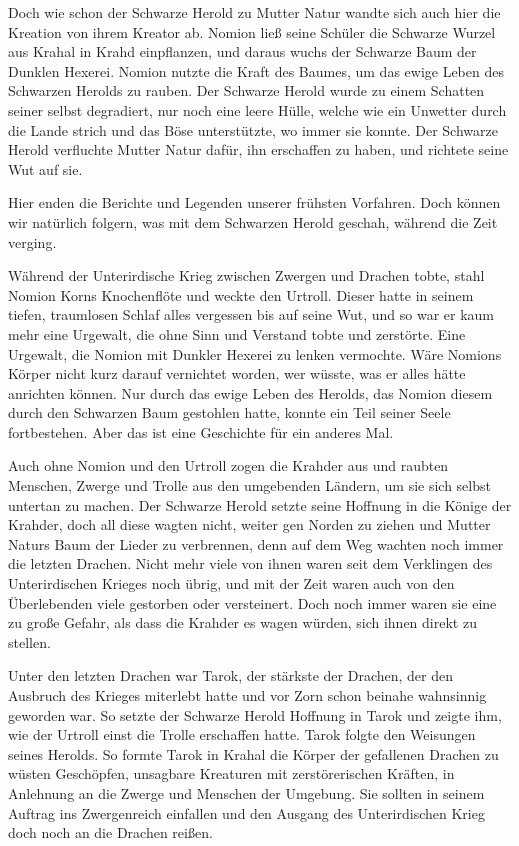 \documentclass[10pt, a4paper, oneside]{book}
\begin{document}
Doch wie schon der Schwarze Herold zu Mutter Natur wandte sich auch hier die Kreation von ihrem Kreator ab. Nomion ließ seine Schüler die Schwarze Wurzel aus Krahal in Krahd einpflanzen, und daraus wuchs der Schwarze Baum der Dunklen Hexerei. Nomion nutzte die Kraft des Baumes, um das ewige Leben des Schwarzen Herolds zu rauben. Der Schwarze Herold wurde zu einem Schatten seiner selbst degradiert, nur noch eine leere Hülle, welche wie ein Unwetter durch die Lande strich und das Böse unterstützte, wo immer sie konnte. Der Schwarze Herold verfluchte Mutter Natur dafür, ihn erschaffen zu haben, und richtete seine Wut auf sie.\bigskip

Hier enden die Berichte und Legenden unserer frühsten Vorfahren. Doch können wir natürlich folgern, was mit dem Schwarzen Herold geschah, während die Zeit verging.

Während der Unterirdische Krieg zwischen Zwergen und Drachen tobte, stahl Nomion Korns Knochenflöte und weckte den Urtroll. Dieser hatte in seinem tiefen, traumlosen Schlaf alles vergessen bis auf seine Wut, und so war er kaum mehr eine Urgewalt, die ohne Sinn und Verstand tobte und zerstörte. Eine Urgewalt, die Nomion mit Dunkler Hexerei zu lenken vermochte. Wäre Nomions Körper nicht kurz darauf vernichtet worden, wer wüsste, was er alles hätte anrichten können. Nur durch das ewige Leben des Herolds, das Nomion diesem durch den Schwarzen Baum gestohlen hatte, konnte ein Teil seiner Seele fortbestehen. Aber das ist eine Geschichte für ein anderes Mal.

Auch ohne Nomion und den Urtroll zogen die Krahder aus und raubten Menschen, Zwerge und Trolle aus den umgebenden Ländern, um sie sich selbst untertan zu machen. Der Schwarze Herold setzte seine Hoffnung in die Könige der Krahder, doch all diese wagten nicht, weiter gen Norden zu ziehen und Mutter Naturs Baum der Lieder zu verbrennen, denn auf dem Weg wachten noch immer die letzten Drachen. Nicht mehr viele von ihnen waren seit dem Verklingen des Unterirdischen Krieges noch übrig, und mit der Zeit waren auch von den Überlebenden viele gestorben oder versteinert. Doch noch immer waren sie eine zu große Gefahr, als dass die Krahder es wagen würden, sich ihnen direkt zu stellen.

Unter den letzten Drachen war Tarok, der stärkste der Drachen, der den Ausbruch des Krieges miterlebt hatte und vor Zorn schon beinahe wahnsinnig geworden war. So setzte der Schwarze Herold Hoffnung in Tarok und zeigte ihm, wie der Urtroll einst die Trolle erschaffen hatte. Tarok folgte den Weisungen seines Herolds. So formte Tarok in Krahal die Körper der gefallenen Drachen zu wüsten Geschöpfen, unsagbare Kreaturen mit zerstörerischen Kräften, in Anlehnung an die Zwerge und Menschen der Umgebung. Sie sollten in seinem Auftrag ins Zwergenreich einfallen und den Ausgang des Unterirdischen Krieg doch noch an die Drachen reißen.
\end{document}
